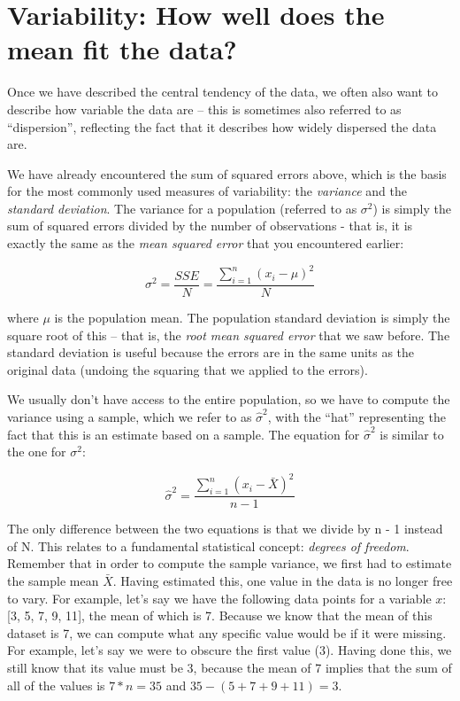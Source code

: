 \documentclass[12pt,]{book}
\theoremstyle{definition}
\theoremstyle{definition}
\theoremstyle{definition}
\theoremstyle{remark}
\begin{document}
\hypertarget{variability-how-well-does-the-mean-fit-the-data}{%
\section{Variability: How well does the mean fit the data?}\label{variability-how-well-does-the-mean-fit-the-data}}

Once we have described the central tendency of the data, we often also want to describe how variable the data are -- this is sometimes also referred to as ``dispersion'', reflecting the fact that it describes how widely dispersed the data are.

We have already encountered the sum of squared errors above, which is the basis for the most commonly used measures of variability: the \emph{variance} and the \emph{standard deviation}. The variance for a population (referred to as \(\sigma^2\)) is simply the sum of squared errors divided by the number of observations - that is, it is exactly the same as the \emph{mean squared error} that you encountered earlier:

\[
\sigma^2 = \frac{SSE}{N} = \frac{\sum_{i=1}^n (x_i - \mu)^2}{N}
\]

where \(\mu\) is the population mean. The population standard deviation is simply the square root of this -- that is, the \emph{root mean squared error} that we saw before. The standard deviation is useful because the errors are in the same units as the original data (undoing the squaring that we applied to the errors).

We usually don't have access to the entire population, so we have to compute the variance using a sample, which we refer to as \(\hat{\sigma}^2\), with the ``hat'' representing the fact that this is an estimate based on a sample. The equation for \(\hat{\sigma}^2\) is similar to the one for \(\sigma^2\):

\[
\hat{\sigma}^2 = \frac{\sum_{i=1}^n (x_i - \bar{X})^2}{n-1}
\]

The only difference between the two equations is that we divide by n - 1 instead of N. This relates to a fundamental statistical concept: \emph{degrees of freedom}. Remember that in order to compute the sample variance, we first had to estimate the sample mean \(\bar{X}\). Having estimated this, one value in the data is no longer free to vary. For example, let's say we have the following data points for a variable \(x\): {[}3, 5, 7, 9, 11{]}, the mean of which is 7. Because we know that the mean of this dataset is 7, we can compute what any specific value would be if it were missing. For example, let's say we were to obscure the first value (3). Having done this, we still know that its value must be 3, because the mean of 7 implies that the sum of all of the values is \(7 * n = 35\) and \(35 - (5 + 7 + 9 + 11) = 3\).
\end{document}
